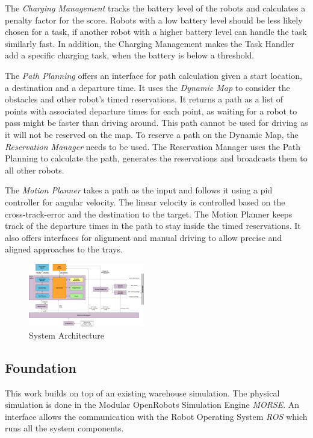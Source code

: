 \documentclass[journal]{IEEEtran}
\begin{document}
The \emph{Charging Management} tracks the battery level of the robots and calculates a penalty factor for the score. Robots with a low battery level should be less likely chosen for a task, if another robot with a higher battery level can handle the task similarly fast. In addition, the Charging Management makes the Task Handler add a specific charging task, when the battery is below a threshold.

The \emph{Path Planning} offers an interface for path calculation given a start location, a destination and a departure time. It uses the \emph{Dynamic Map} to consider the obstacles and other robot's timed reservations. It returns a path as a list of points with associated departure times for each point, as waiting for a robot to pass might be faster than driving around. This path cannot be used for driving as it will not be reserved on the map. To reserve a path on the Dynamic Map, the \emph{Reservation Manager} needs to be used. The Reservation Manager uses the Path Planning to calculate the path, generates the reservations and broadcasts them to all other robots.

The \emph{Motion Planner} takes a path as the input and follows it using a pid controller for angular velocity. The linear velocity is controlled based on the cross-track-error and the destination to the target. The Motion Planner keeps track of the departure times in the path to stay inside the timed reservations. It also offers interfaces for alignment and manual driving to allow precise and aligned approaches to the trays.

\begin{figure}[h]
	\centering
	\includegraphics[width=0.45\textwidth]{resources/system_architecture}
	\caption{System Architecture}
	\label{fig:system_architecture}
\end{figure}

\subsection{Foundation}
\label{subsec:foundation}
This work builds on top of an existing warehouse simulation. The physical simulation is done in the Modular OpenRobots Simulation Engine \emph{MORSE}. An interface allows the communication with the Robot Operating System \emph{ROS} which runs all the system components.
\end{document}
